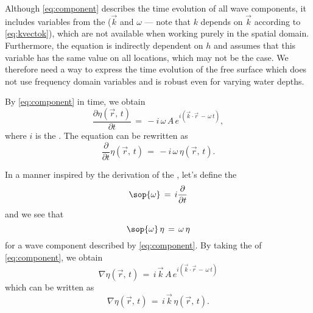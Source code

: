 Although \eqref{eq:component} describes the time evolution of all wave components, it includes variables from the  ($\vec{k}$ and $\omega$ --- note that $k$ depends on $\vec{k}$ according to \eqref{eq:kvectok}), which are not available when working purely in the spatial domain. Furthermore, the equation is indirectly dependent on $h$ and assumes that this variable has the same value on all locations, which may not be the case. We therefore need a way to express the time evolution of the free surface which does not use frequency domain variables and is robust even for varying water depths.

By  \eqref{eq:component} in time, we obtain
%
\begin{equation}
\frac{\partial\eta(\vec{r},\,t)}{\partial t} \,=\, -i\,\omega\,A\,e^{i(\vec{k}\cdot\vec{r}\,-\,\omega\,t)},
\end{equation}
%
where $i$ is the . The equation can be rewritten as
%
\begin{equation}
\frac{\partial}{\partial t}\eta(\vec{r},\,t) \,=\, -i\,\omega\,\eta(\vec{r},\,t).
\end{equation}

In a manner inspired by the derivation of the  \citep{Bransden2000}, let's define the 
%
\begin{equation} \label{eq:opomega}
\sop{\omega} \,=\, i\frac{\partial}{\partial t}
\end{equation}
%
and we see that
%
\begin{equation} \label{eq:opomegaaction}
\sop{\omega}\,\eta \,=\, \omega\,\eta
\end{equation}
%
for a wave component described by \eqref{eq:component}. By taking the  of \eqref{eq:component}, we obtain
%
\begin{equation}
\nabla\eta(\vec{r},\,t) \,=\, i\,\vec{k}\,A\,e^{i(\vec{k}\cdot\vec{r}\,-\,\omega\,t)}
\end{equation}
%
which can be written as
%
\begin{equation}
\nabla\eta(\vec{r},\,t) \,=\, i\,\vec{k}\,\eta(\vec{r},\,t).
\end{equation}

